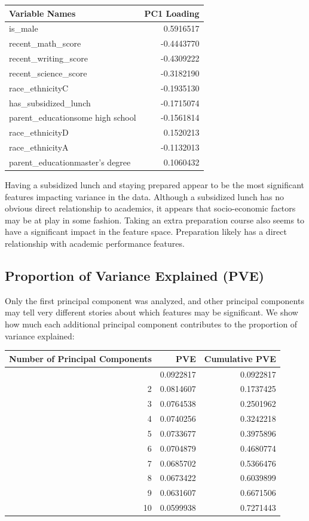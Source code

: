 \documentclass[
]{article}
\begin{document}
\begin{longtable}[]{@{}lr@{}}
\toprule\noalign{}
Variable Names & PC1 Loading \\
\midrule\noalign{}
\endhead
\bottomrule\noalign{}
\endlastfoot
is\_male & 0.5916517 \\
recent\_math\_score & -0.4443770 \\
recent\_writing\_score & -0.4309222 \\
recent\_science\_score & -0.3182190 \\
race\_ethnicityC & -0.1935130 \\
has\_subsidized\_lunch & -0.1715074 \\
parent\_educationsome high school & -0.1561814 \\
race\_ethnicityD & 0.1520213 \\
race\_ethnicityA & -0.1132013 \\
parent\_educationmaster's degree & 0.1060432 \\
\end{longtable}

Having a subsidized lunch and staying prepared appear to be the most
significant features impacting variance in the data. Although a
subsidized lunch has no obvious direct relationship to academics, it
appears that socio-economic factors may be at play in some fashion.
Taking an extra preparation course also seems to have a significant
impact in the feature space. Preparation likely has a direct
relationship with academic performance features.

\subsection{Proportion of Variance Explained
(PVE)}\label{proportion-of-variance-explained-pve}

Only the first principal component was analyzed, and other principal
components may tell very different stories about which features may be
significant. We show how much each additional principal component
contributes to the proportion of variance explained:

\begin{longtable}[]{@{}rrr@{}}
\toprule\noalign{}
Number of Principal Components & PVE & Cumulative PVE \\
\midrule\noalign{}
\endhead
\bottomrule\noalign{}
\endlastfoot
1 & 0.0922817 & 0.0922817 \\
2 & 0.0814607 & 0.1737425 \\
3 & 0.0764538 & 0.2501962 \\
4 & 0.0740256 & 0.3242218 \\
5 & 0.0733677 & 0.3975896 \\
6 & 0.0704879 & 0.4680774 \\
7 & 0.0685702 & 0.5366476 \\
8 & 0.0673422 & 0.6039899 \\
9 & 0.0631607 & 0.6671506 \\
10 & 0.0599938 & 0.7271443 \\
\end{longtable}
\end{document}
